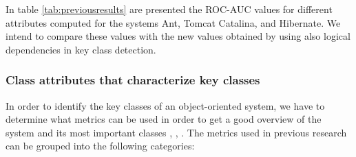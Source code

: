 \documentclass[12pt]{mitthesis}
\begin{document}
In table \ref{tab:previousresults} are presented the ROC-AUC values for different attributes computed for the systems Ant, Tomcat Catalina, and Hibernate. We intend to compare these values with the new values obtained by using also logical dependencies in key class detection.

\begin{table}[!h]
\renewcommand{\arraystretch}{1}
\caption{ROC-AUC metric values extracted. }
\label{tab:previousresults}
\centering
{}
\end{table}


\subsubsection{Class attributes that characterize key classes}
In order to identify the key classes of an object-oriented system, we have to determine what metrics can be used in order to get a good overview of the system and its most important classes \cite{Ding2016AnIA}, \cite{ZaidmanJurnal}, \cite{PAN2018188} . 
The metrics used in previous research can be grouped into the following categories: 
\end{document}
